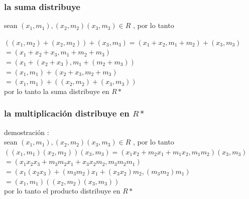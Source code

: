 \documentclass[10pt,a4paper]{article} %
\begin{document}
            \subsubsection{la suma distribuye}
                sean $ (x_1,m_1),(x_2,m_2)(x_3  , m_3) \in R  $ , por lo tanto

                $ ((x_1, m_2) + (x_2 , m_2)) + (x_3 , m_3 )= (x_1 + x_2 , m_1 +
                m_2)+(x_3,m_3)  $
                 \\
                 $ = (x_1 + x_2 + x_3 , m_1 + m_2 + m_3 )
      $              \\
                 $ =( x_1 + (x_2 + x_3) , m_1 + (m_2 + m_3))  $
                 \\
                 $ =(x_1 , m_1) + (x_2 + x_3 , m_2 + m_3)  $
                 \\
                 $ =(x_1 , m_1) + ((x_2,m_2) + (x_3 , m_3))  $
                 \\
                 por lo tanto la suma distribuye en $ R*  $

             \subsubsection{la multiplicación distribuye en $ R*  $ }
                demostración :
                \\
                sean $ (x_1,m_1),(x_2,m_2)(x_3  , m_3) \in R  $ , por lo tanto
                \\
                $ ((x_1 ,m_1)(x_2,m_2))(x_3 , m_3)  = (x_1x_2 + m_2x_1 + m_1x_2 , m_1m_2)(x_3 , m_3) $
                \\
                $ = (x_1x_2x_3 + m_3m_2x_1 + x_3x_2m_2 , m_3m_2m_1)  $
                \\
                $ = (x_1(x_2x_3) + (m_3m_2)x_1 + (x_3x_2)m_2 , (m_3m_2)m_1)  $
                \\
                $ = (x_1,m_1)((x_2,m_2)(x_3,m_3))  $
                \\
                por lo tanto el producto distribuye en $ R*  $
\end{document}
